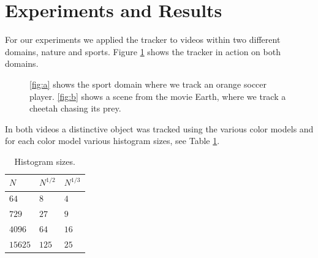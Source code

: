 \documentclass[11pt]{article}
\begin{document}
\section{Experiments and Results}
For our experiments we applied the tracker to videos within two different
domains, nature and sports. Figure \ref{fig:videos} shows the tracker in action
on both domains. 
\begin{figure}[!ht]
\centering
{}
\caption{\ref{fig:a} shows the sport domain where we track an orange soccer
player. \ref{fig:b} shows a scene from the movie Earth, where we track
a cheetah chasing its prey.}
\label{fig:videos}
\end{figure}
In both videos a distinctive object was tracked using the various color models
and for each color model various histogram sizes, see Table \ref{table:bins}.
\begin{table}[!ht]
\centering
\begin{tabular}{l|l|l}
$N$     & $N^{1/2}$ & $N^{1/3}$\\\hline
$64$    & $8$       & $4$\\\hline
$729$   & $27$      & $9$\\\hline
$4096$  & $64$      & $16$\\\hline
$15625$ & $125$     & $25$\\
\end{tabular}
\caption{Histogram sizes.}
\label{table:bins}
\end{table}
\end{document}
